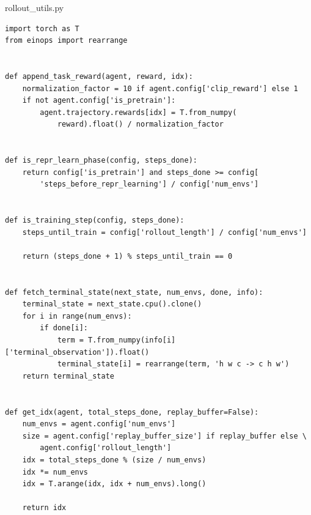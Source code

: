 \documentclass{article}
\begin{document}
rollout\_utils.py
\begin{lstlisting}
import torch as T
from einops import rearrange


def append_task_reward(agent, reward, idx):
    normalization_factor = 10 if agent.config['clip_reward'] else 1
    if not agent.config['is_pretrain']:
        agent.trajectory.rewards[idx] = T.from_numpy(
            reward).float() / normalization_factor


def is_repr_learn_phase(config, steps_done):
    return config['is_pretrain'] and steps_done >= config[
        'steps_before_repr_learning'] / config['num_envs']


def is_training_step(config, steps_done):
    steps_until_train = config['rollout_length'] / config['num_envs']

    return (steps_done + 1) % steps_until_train == 0


def fetch_terminal_state(next_state, num_envs, done, info):
    terminal_state = next_state.cpu().clone()
    for i in range(num_envs):
        if done[i]:
            term = T.from_numpy(info[i]['terminal_observation']).float()
            terminal_state[i] = rearrange(term, 'h w c -> c h w')
    return terminal_state


def get_idx(agent, total_steps_done, replay_buffer=False):
    num_envs = agent.config['num_envs']
    size = agent.config['replay_buffer_size'] if replay_buffer else \
        agent.config['rollout_length']
    idx = total_steps_done % (size / num_envs)
    idx *= num_envs
    idx = T.arange(idx, idx + num_envs).long()

    return idx 
\end{lstlisting}
\newpage
\end{document}
